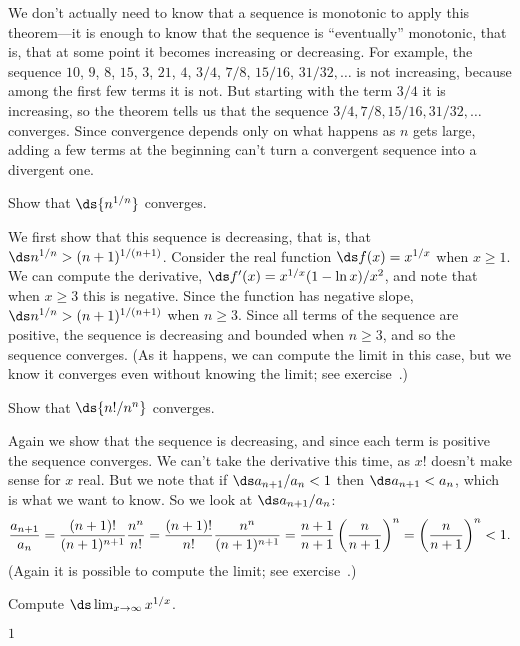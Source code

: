 \begin{theorem}
\begin{theorem}
\begin{theorem}
\begin{theorem}
We don't actually need to know that a sequence is monotonic to apply
this theorem---it is enough to know that the sequence is
``eventually'' monotonic, that is, that at some point it becomes
increasing or decreasing. For example, the sequence $10$, $9$, $8$,
$15$, $3$, $21$, $4$, $3/4$, $7/8$, $15/16$, $31/32,\ldots$ is not
increasing, because among the first few terms it is not. But starting
with the term $3/4$ it is increasing, so the theorem tells us that the
sequence $3/4, 7/8, 15/16, 31/32,\ldots$ converges.  Since convergence
depends only on what happens as $n$ gets large, adding a few
terms at the beginning can't turn a convergent sequence into a
divergent one.

\begin{example}
Show that $\ds\{n^{1/n}\}$ converges. 
\par\nobreak\ssk\noindent
We first show that 
this sequence is decreasing, that is, that $\ds n^{1/n}>
(n+1)^{1/(n+1)}$. Consider the real function $\ds f(x)=x^{1/x}$ when
$x\ge1$. We can compute the derivative, $\ds f'(x)=x^{1/x}(1-\ln x)/x^2$,
and note that when $x\ge 3$ this is negative. Since the function has
negative slope, $\ds n^{1/n}>
(n+1)^{1/(n+1)}$ when $n\ge 3$. Since all terms of the sequence are
positive, the sequence is decreasing and bounded when $n\ge3$, and so
the sequence converges. (As it happens, we can compute the limit in
this case, but we know it converges even without knowing the limit; see
exercise~.)
\end{example}

\begin{example}
Show that $\ds\{n!/n^n\}$ converges.
\par\nobreak\ssk\noindent
Again we show that the sequence is decreasing, and since each term is
positive the sequence converges. We can't take the derivative this
time, as $x!$ doesn't make sense for $x$ real. But we note that if 
$\ds a_{n+1}/a_n < 1$ then $\ds a_{n+1}< a_n$, which is what we want to
know. So we look at $\ds a_{n+1}/a_n$:
$$ 
  {a_{n+1}\over a_n} = {(n+1)!\over (n+1)^{n+1}}{n^n\over n!}=
  {(n+1)!\over n!}{n^n\over (n+1)^{n+1}}=
  {n+1\over n+1}\left({n\over n+1}\right)^n=
  \left({n\over n+1}\right)^n < 1.
$$
(Again it is possible to compute the limit; see
exercise~.)
\end{example}

\begin{exercises}

\exercise \label{exercise:exponential limit}
Compute $\ds\lim_{x\to\infty} x^{1/x}$.
\begin{answer} $1$
\end{answer}


\end{exercises}
\end{theorem}
\end{theorem}
\end{theorem}
\end{theorem}
